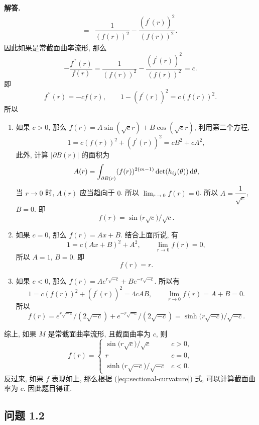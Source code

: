 \documentclass{ctexart}
\newenvironment{solution}{\par\noindent\textbf{解答. }}{\par}
\begin{document}
\begin{solution}
\begin{equation}
\begin{aligned}
        ={} & \dfrac{1}{(f(r))^2} - \dfrac{(f^{\prime}(r))^2}{(f(r))^2}.
        \end{aligned}
    \end{equation}
    因此如果是常截面曲率流形, 那么
    \[
        -\dfrac{f^{\prime\prime}(r)}{f(r)} = \dfrac{1}{(f(r))^2} - \dfrac{(f^{\prime}(r))^2}{(f(r))^2} = c.
    \]
    即
    \[
        f^{\prime\prime}(r) = -cf(r), \qquad 1 - (f^{\prime}(r))^2 = c(f(r))^2.
    \]
    所以
    \begin{enumerate}
        \item 如果 $c > 0$, 那么 $f(r) = A \sin (\sqrt{c}r) + B \cos (\sqrt{c}r)$, 利用第二个方程,
        \[
            1 = c(f(r))^2 + (f^\prime (r))^2 = c B^2 + c A^2,
        \]
        此外, 计算 $|\partial B(r)|$ 的面积为
        \[
            A(r) = \int_{\partial B(r)} (f(r))^{2(m - 1)} \det (h_{ij}(\theta)) \mathop{}\!\mathrm{d} \theta,
        \]
        当 $r \rightarrow 0$ 时, $A(r)$ 应当趋向于 $0$. 所以 $\lim_{r \rightarrow 0} f(r) = 0$. 所以 $A = \dfrac{1}{\sqrt{c}}$, $B = 0$. 即
        \[
            f(r) = \sin \bigl( r\sqrt{c} \bigr) / \sqrt{c}.
        \]
        \item 如果 $c = 0$, 那么 $f(r) = Ax + B$. 结合上面所说, 有
        \[
            1 = c(Ax + B)^2 + A^2, \qquad \lim_{r \rightarrow 0} f(r) = 0,
        \]
        所以 $A = 1$, $B = 0$. 即
        \[
            f(r) = r.
        \] 
        \item 如果 $c < 0$, 那么 $f(r) = A e^{r \sqrt{-c}} + B e^{-r \sqrt{-c}}$. 所以有
        \[
            1 = c(f(r))^2 + (f^\prime (r))^2 = 4c AB, \qquad \lim_{r \rightarrow 0} f(r) = A + B = 0.
        \]
        所以
        \[
            f(r) = e^{r \sqrt{-c}} / (2 \sqrt{-c}) + e^{-r \sqrt{-c}} / (2 \sqrt{-c}) = \sinh \bigl( r \sqrt{-c} \bigr)/ \sqrt{-c}.
        \]
    \end{enumerate}
    综上, 如果 $M$ 是常截面曲率流形, 且截面曲率为 $c$, 则 
    \[
        f(r) = \left\{
            \begin{array}{ll}
                \sin \bigl( r\sqrt{c} \bigr) / \sqrt{c} & c > 0, \\
                r & c = 0, \\
                \sinh \bigl( r \sqrt{-c} \bigr)/ \sqrt{-c} & c < 0.
            \end{array}
        \right.
    \]
    反过来, 如果 $f$ 表现如上, 那么根据 (\ref{eq::sectional-curvature}) 式, 可以计算截面曲率为 $c$. 因此题目得证.
\end{solution}

\subsection{问题 1.2}
\end{document}
